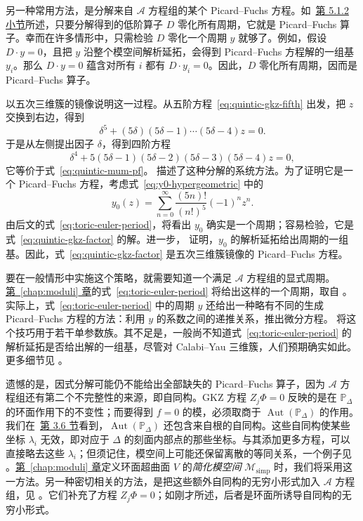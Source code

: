 另一种常用方法，是分解来自 $\mathcal A$ 方程组的某个 Picard--Fuchs 方程。如~\hyperref[subsec:picard-fuchs]{第 5.1.2 小节}所述，只要分解得到的低阶算子 $D$ 零化所有周期，它就是 Picard--Fuchs 算子。幸而在许多情形中，只需检验 $D$ 零化一个周期 $y$ 就够了。例如，假设 $D\cdot y=0$，且把 $y$ 沿整个模空间解析延拓，会得到 Picard--Fuchs 方程解的一组基 $y_i$。那么 $D\cdot y=0$ 蕴含对所有 $i$ 都有 $D\cdot y_i=0$。因此，$D$ 零化所有周期，因而是 Picard--Fuchs 算子。

以五次三维簇的镜像说明这一过程。从五阶方程~\eqref{eq:quintic-gkz-fifth} 出发，把 $z$ 交换到右边，得到
\[
\delta^5+(5\delta)(5\delta-1)\cdots(5\delta-4)z=0.
\]
于是从左侧提出因子 $\delta$，得到四阶方程
\begin{equation}\label{eq:quintic-gkz-factor}
\delta^4+5(5\delta-1)(5\delta-2)(5\delta-3)(5\delta-4)z=0,
\end{equation}
它等价于式~\eqref{eq:quintic-mum-pf}。 描述了这种分解的系统方法。为了证明它是一个 Picard--Fuchs 方程，考虑式~\eqref{eq:y0-hypergeometric} 中的
\[
y_0(z)=\sum_{n=0}^\infty\frac{(5n)!}{(n!)^5}(-1)^nz^n.
\]
由后文的式~\eqref{eq:toric-euler-period}，将看出 $y_0$ 确实是一个周期；容易检验，它是式~\eqref{eq:quintic-gkz-factor} 的解。进一步， 证明，$y_0$ 的解析延拓给出周期的一组基。因此，式~\eqref{eq:quintic-gkz-factor} 是五次三维簇镜像的 Picard--Fuchs 方程。

要在一般情形中实施这个策略，就需要知道一个满足 $\mathcal A$ 方程组的显式周期。\hyperref[chap:moduli]{第~\ref*{chap:moduli} 章}的式~\eqref{eq:toric-euler-period} 将给出这样的一个周期，取自 。实际上，式~\eqref{eq:toric-euler-period} 中的周期 $y$ 还给出一种略有不同的生成 Picard--Fuchs 方程的方法：利用 $y$ 的系数之间的递推关系，推出微分方程。 将这个技巧用于若干单参数族。其不足是，一般尚不知道式~\eqref{eq:toric-euler-period} 的解析延拓是否给出解的一组基，尽管对 Calabi--Yau 三维簇，人们预期确实如此。更多细节见 。

遗憾的是，因式分解可能仍不能给出全部缺失的 Picard--Fuchs 算子，因为 $\mathcal A$ 方程组还有第二个不完整性的来源，即自同构。GKZ 方程 $Z_j\Phi=0$ 反映的是在 $\mathbb P_\Delta$ 的环面作用下的不变性；而要得到 $f=0$ 的模，必须取商于 $\operatorname{Aut}(\mathbb P_\Delta)$ 的作用。我们在~\hyperref[sec:toric-automorphisms]{第 3.6 节}看到，$\operatorname{Aut}(\mathbb P_\Delta)$ 还包含来自根的自同构。这些自同构使某些坐标 $\lambda_i$ 无效，即对应于 $\Delta$ 的刻面内部点的那些坐标。与其添加更多方程，可以直接略去这些 $\lambda_i$；但须记住，模空间上可能还保留离散的等同关系，一个例子见 。\hyperref[chap:moduli]{第~\ref*{chap:moduli} 章}定义环面超曲面 $V$ 的\emph{简化模空间} $\mathcal M_{\mathrm{simp}}$ 时，我们将采用这一方法。另一种密切相关的方法，是把这些额外自同构的无穷小形式加入 $\mathcal A$ 方程组，见 。它们补充了方程 $Z_j\Phi=0$；如刚才所述，后者是环面所诱导自同构的无穷小形式。

